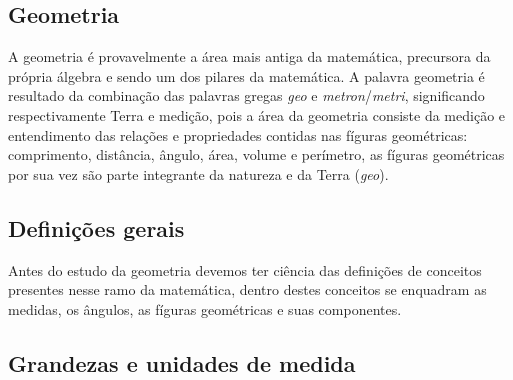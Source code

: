 \renewcommand{\sectionauthor}{Gustavo Ale}

\begin{multicols*}{2}

    \section*{Geometria}
    A geometria é provavelmente a área mais antiga da matemática, precursora da própria álgebra e sendo um dos pilares
    da matemática. A palavra geometria é resultado da combinação das palavras gregas \textit{geo} e
    \textit{metron}/\textit{metri}, significando respectivamente Terra e medição, pois a área da geometria consiste da
    medição e entendimento das relações e propriedades  contidas nas fíguras geométricas: comprimento, distância, ângulo,
    área, volume e perímetro, as fíguras geométricas por sua vez são parte integrante da natureza e da Terra (\textit{geo}).

    \subsection*{Definições gerais}
    Antes do estudo da geometria devemos ter ciência das definições de conceitos presentes nesse ramo da matemática,
    dentro destes conceitos se enquadram as medidas, os ângulos, as fíguras geométricas e suas componentes.
    
    \vfill\null
    \columnbreak
    \vfill\null

    \subsection*{Grandezas e unidades de medida}

\end{multicols*}
